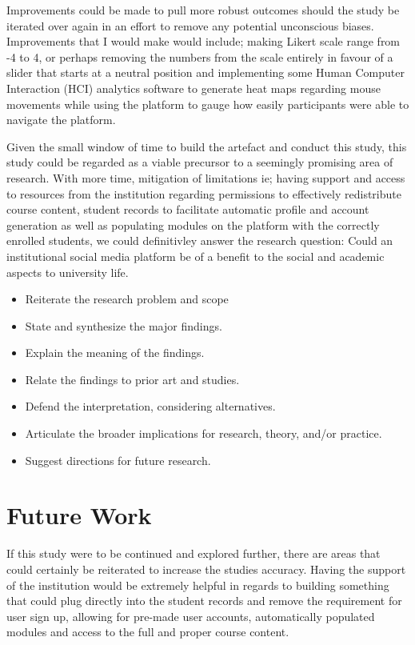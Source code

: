 \documentclass[lettersize,journal]{IEEEtran}
\begin{document}
Improvements could be made to pull more robust outcomes should the study be iterated over again in an effort to remove any potential unconscious biases. Improvements that I would make would include; making
Likert scale range from -4 to 4, or perhaps removing the numbers from the scale entirely in favour of a slider that starts at a neutral position and implementing some Human Computer Interaction
(HCI) analytics software to generate heat maps regarding mouse movements while using the platform to gauge how easily participants were able to navigate the platform.

Given the small window of time to build the artefact and conduct this study, this study could be regarded as a viable precursor to a seemingly promising area of research. With more time, mitigation of 
limitations ie; having support and access to resources from the institution regarding permissions to effectively redistribute course content, student records to facilitate automatic profile and account generation as well as populating modules on the platform with the correctly enrolled students, we could definitivley answer the research question: Could an institutional social media platform be of a benefit
to the social and academic aspects to university life.


\begin{itemize}
        \item Reiterate the research problem and scope
        \item State and synthesize the major findings.
        \item Explain the meaning of the findings.
        \item Relate the findings to prior art and studies.
        \item Defend the interpretation, considering alternatives.
        \item Articulate the broader implications for research, theory, and/or practice.
        \item Suggest directions for future research.
\end{itemize}






\section{Future Work}
        If this study were to be continued and explored further, there are areas that could certainly be reiterated to increase the studies accuracy. Having the support of the institution
	would be extremely helpful in regards to building something that could plug directly into the student records and remove the requirement for user sign up, allowing for pre-made user
	accounts, automatically populated modules and access to the full and proper course content.
\end{document}
